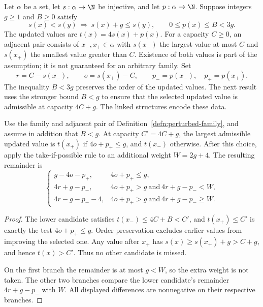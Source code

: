 \begin{defn}
\label{defn:perturbed-family}
Let $\alpha$ be a set, let $s:\alpha\to\N$ be injective, and let
$p:\alpha\to\N$.  Suppose integers $g\ge1$ and $B\ge0$ satisfy
\[
 s(x)<s(y)\ \Longrightarrow\ s(x)+g\le s(y),
 \qquad 0\le p(x)\le B<3g.
\]
The updated values are $t(x)=4s(x)+p(x)$.
For a capacity $C\ge0$, an adjacent pair consists of $x_-,x_+\in\alpha$
with $s(x_-)$ the largest value at most $C$ and $s(x_+)$ the
smallest value greater than $C$.  Existence of both values is part
of the assumption; it is not guaranteed for an arbitrary family.
Set
\[
 r=C-s(x_-),\qquad o=s(x_+)-C,\qquad
 p_-=p(x_-),\quad p_+=p(x_+).
\]
The inequality $B<3g$ preserves the order of the updated values.
The next result uses the stronger bound $B<g$ to ensure that the
selected updated value is admissible at capacity $4C+g$.
The linked structures encode these data.
\par
{}
\end{defn}

\begin{thm}
\label{thm:perturbed-family-maximality}
Use the family and adjacent pair of
Definition~\ref{defn:perturbed-family}, and assume in addition that
$B<g$.  At capacity $C'=4C+g$, the largest admissible updated value
is $t(x_+)$ if $4o+p_+\le g$, and $t(x_-)$ otherwise.
After this choice, apply the take-if-possible rule to an additional
weight $W=2g+4$.  The resulting remainder is
\[
 \begin{cases}
 g-4o-p_+,&4o+p_+\le g,\\
 4r+g-p_-,&4o+p_+>g\ \text{and}\ 4r+g-p_-<W,\\
 4r-g-p_--4,&4o+p_+>g\ \text{and}\ 4r+g-p_-\ge W.
 \end{cases}
\]
\end{thm}

\begin{proof}
The lower candidate satisfies $t(x_-)\le4C+B<C'$, and
$t(x_+)\le C'$ is exactly the test $4o+p_+\le g$.
Order preservation excludes earlier values from improving the
selected one.  Any value after $x_+$ has
$s(x)\ge s(x_+)+g>C+g$, and hence $t(x)>C'$.
Thus no other candidate is missed.

On the first branch the remainder is at most $g<W$, so the extra
weight is not taken.  The other two branches compare the lower
candidate's remainder $4r+g-p_-$ with $W$.
All displayed differences are nonnegative on their respective branches.
\end{proof}


